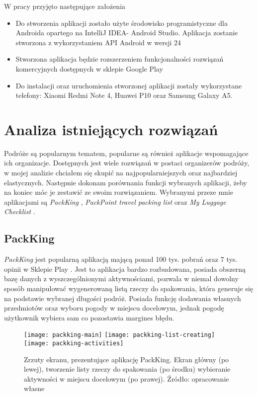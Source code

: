 \documentclass[a4paper,12pt]{article}
\begin{document}
W pracy przyjęto następujące założenia
\begin{itemize}
		\item Do stworzenia aplikacji zostało użyte środowisko programistyczne dla Androida opartego na IntelliJ IDEA- Android Studio. Aplikacja zostanie stworzona z wykorzystaniem API Android w wersji 24
		\item Stworzona aplikacja będzie rozszerzeniem funkcjonalności rozwiązań komercyjnych dostępnych w sklepie Google Play
		\item Do instalacji oraz uruchomienia stworzonej aplikacji zostały wykorzystane telefony: Xiaomi Redmi Note 4, Huawei P10 oraz Samsung Galaxy A5.
\end{itemize}

\newpage
\section{Analiza istniejących rozwiązań} \label{analiza}
Podróże są popularnym tematem, popularne są również aplikacje wspomagające ich organizacje. Dostępnych jest wiele rozwiązań w postaci organizerów podróży, w mojej analizie chciałem się skupić na najpopularniejszych oraz najbardziej elastycznych. Następnie dokonam porównania funkcji wybranych aplikacji, żeby na koniec móc je zestawić ze swoim rozwiązaniem. Wybranymi przeze mnie aplikacjami są \textit{PackKing} \cite{packking}, \textit{PackPoint travel packing list} \cite{packpoint} oraz \textit {My Luggage Checklist} \cite{mlc}.

\subsection{PackKing} \label{packking}

\textit{PackKing} jest popularną aplikacją mającą ponad 100 tys. pobrań oraz 7 tys. opinii w Sklepie Play \cite{packking}. Jest to aplikacja bardzo rozbudowana, posiada obszerną bazę danych z wyszczególnionymi aktywnościami, pozwala w niemal dowolny sposób manipulować wygenerowaną listą rzeczy do spakowania, która generuje się na podstawie wybranej długości podróż. Posiada funkcję dodawania własnych przedmiotów oraz wyboru pogody w miejscu docelowym, jednak pogodę użytkownik wybiera sam co pozostawia margines błędu. 

\begin{figure}[H]
    \centering
    \texttt{[image: packking-main]}
    \hfill
    \texttt{[image: packking-list-creating]}
    \hfill
    \texttt{[image: packking-activities]}
    \caption{Zrzuty ekranu, prezentujące aplikację PackKing. Ekran główny (po lewej), tworzenie listy rzeczy do spakowania (po środku) wybieranie aktywności w miejscu docelowym (po prawej). Źródło: opracowanie własne}
    \label{fig:packking-screenshots}
\end{figure}
\end{document}
